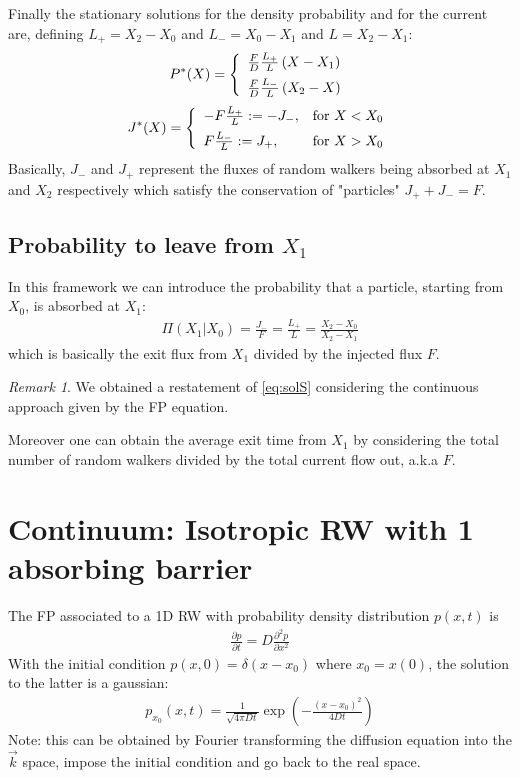 \documentclass[4apaper,11pt,fleqn]{article}
\theoremstyle{remark}
\newtheorem*{rem}{Remark}
\theoremstyle{definition}
\begin{document}
Finally the stationary solutions for the density probability and for the current are, defining $L_+ = X_2-X_0$ and $L_- = X_0-X_1$ and $L = X_2-X_1$:
\begin{align*}
  P^{*}(X)=\left\{\begin{array}{l}{\frac{F}{D} \frac{L_{+}}{L}\left(X-X_{1}\right)} \vspace{5pt} \\
  {\frac{F}{D} \frac{L_{-}}{L}\left(X_{2}-X\right)}\end{array}\right.
\end{align*}
\begin{align*}
  J^{*}(X)=\left\{\begin{array}{ll}{-F \frac{L_{+}}{L} := -J_{-},} & {\text {for } X<X_{0}} \vspace{5pt}\\
  {F \frac{L_{-}}{L} := J_{+},} & {\text {for } X>X_{0}}\end{array}\right.
\end{align*}
Basically, $J_-$ and $J_+$ represent the fluxes of random walkers being absorbed at $X_1$ and $X_2$ respectively which satisfy the conservation of "particles" $J_+ + J_- = F$.

\subsection{Probability to leave from $X_1$}
In this framework we can introduce the probability that a particle, starting from $X_0$, is absorbed at $X_1$:
\begin{align}
  \label{eq:prob_absorbing_FP}
  \Pi\left(X_{1} | X_{0}\right)=\frac{J_{-}}{F}=\frac{L_{+}}{L}=\frac{X_{2}-X_{0}}{X_{2}-X_{1}}
\end{align}
which is basically the exit flux from $X_1$ divided by the injected flux $F$.
\begin{rem}
  We obtained a restatement of \eqref{eq:solS} considering the continuous approach given by the FP equation.
\end{rem}
Moreover one can obtain the average exit time from $X_1$ by considering the total number of random walkers divided by the total current flow out, a.k.a $F$.


\section{Continuum: Isotropic RW with 1 absorbing barrier}
The FP associated to a 1D RW with  probability density distribution $p(x,t)$ is
\begin{align*}
  \frac{\partial p}{\partial t}=D \frac{\partial^{2} p}{\partial x^{2}}
\end{align*}
With the initial condition $p(x,0)=\delta(x-x_0)$ where $x_0 = x(0)$, the solution to the latter is a gaussian:
\begin{align*}
  p_{x_{0}}(x, t)=\frac{1}{\sqrt{4 \pi D t}} \exp \left(-\frac{\left(x-x_{0}\right)^{2}}{4 D t}\right)
\end{align*}
Note: this can be obtained by Fourier transforming the diffusion equation into the $\vec{k}$ space, impose the initial condition and go back to the real space.
\end{document}
